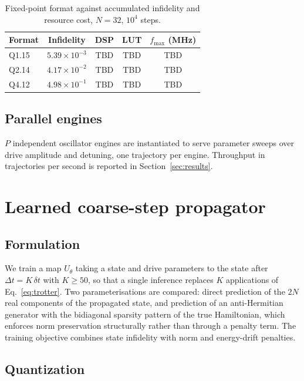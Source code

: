 \documentclass[smallextended]{svjour3}
\begin{document}
\begin{table}[t]
\caption{Fixed-point format against accumulated infidelity and resource cost,
$N = 32$, $10^4$ steps.}
\label{tab:fixedpoint}
\begin{tabular}{lcccc}
\toprule
Format & Infidelity & DSP & LUT & $f_{\max}$ (MHz) \\
\midrule
Q1.15 & $5.39\times10^{-3}$ & TBD & TBD & TBD \\
Q2.14 & $4.17\times10^{-2}$ & TBD & TBD & TBD \\
Q4.12 & $4.98\times10^{-1}$ & TBD & TBD & TBD \\
\bottomrule
\end{tabular}
\end{table}

\subsection{Parallel engines}

$P$ independent oscillator engines are instantiated to serve parameter sweeps over drive
amplitude and detuning, one trajectory per engine. Throughput in trajectories per second
is reported in Section~\ref{sec:results}.

\section{Learned coarse-step propagator}
\label{sec:ml}

\subsection{Formulation}

We train a map $U_\theta$ taking a state and drive parameters to the state after
$\Delta t = K\,\delta t$ with $K \ge 50$, so that a single inference replaces $K$
applications of Eq.~\eqref{eq:trotter}. Two parameterisations are compared: direct
prediction of the $2N$ real components of the propagated state, and prediction of an
anti-Hermitian generator with the bidiagonal sparsity pattern of the true Hamiltonian,
which enforces norm preservation structurally rather than through a penalty term. The
training objective combines state infidelity with norm and energy-drift penalties.

\subsection{Quantization}
\end{document}
